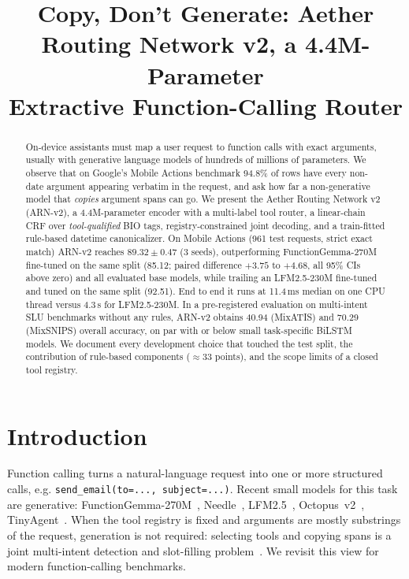 \documentclass[11pt]{article}
\title{Copy, Don't Generate: Aether Routing Network v2, a 4.4M-Parameter\\Extractive Function-Calling Router}
\author{\PENDING{author names and affiliations}}
\date{}
\newcommand{\arn}{ARN-v2}
\begin{document}
\maketitle

\begin{abstract}
On-device assistants must map a user request to function calls with exact arguments, usually with
generative language models of hundreds of millions of parameters. We observe that on Google's Mobile
Actions benchmark 94.8\% of rows have every non-date argument appearing verbatim in the request, and
ask how far a non-generative model that \emph{copies} argument spans can go. We present the Aether
Routing Network v2 (\arn{}), a 4.4M-parameter encoder with a multi-label tool router, a linear-chain
CRF over \emph{tool-qualified} BIO tags, registry-constrained joint decoding, and a train-fitted
rule-based datetime canonicalizer. On Mobile Actions (961 test requests, strict exact match) \arn{}
reaches $89.32 \pm 0.47$ (3 seeds), outperforming FunctionGemma-270M fine-tuned on the same split
(85.12; paired difference $+3.75$ to $+4.68$, all 95\% CIs above zero) and all evaluated base models,
while trailing an LFM2.5-230M fine-tuned and tuned on the same split (92.51). End to end it runs at
11.4\,ms median on one CPU thread versus 4.3\,s for LFM2.5-230M. In a pre-registered evaluation on
multi-intent SLU benchmarks without any rules, \arn{} obtains 40.94 (MixATIS) and 70.29 (MixSNIPS)
overall accuracy, on par with or below small task-specific BiLSTM models. We document every
development choice that touched the test split, the contribution of rule-based components ($\approx$33
points), and the scope limits of a closed tool registry.
\end{abstract}

\section{Introduction}
Function calling turns a natural-language request into one or more structured calls, e.g.
\texttt{send\_email(to=..., subject=...)}. Recent small models for this task are generative:
FunctionGemma-270M~\cite{functiongemma}, Needle~\cite{needle}, LFM2.5~\cite{lfm25},
Octopus~v2~\cite{octopus}, TinyAgent~\cite{tinyagent}. When the tool registry is fixed and arguments are
mostly substrings of the request, generation is not required: selecting tools and copying spans is a
joint multi-intent detection and slot-filling problem~\cite{jointbert,agif}. We revisit this view for
modern function-calling benchmarks.
\end{document}
